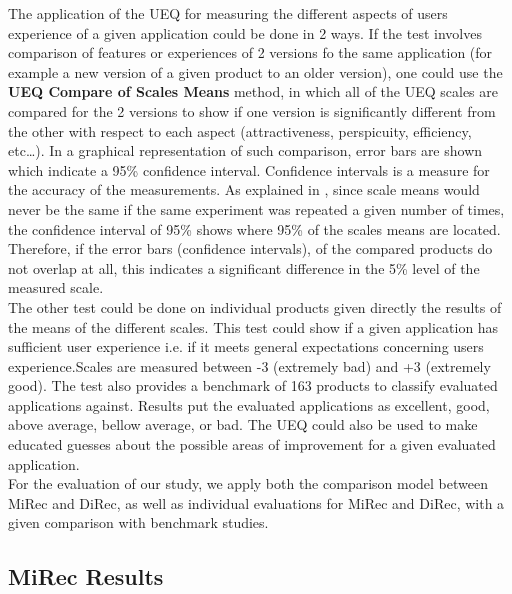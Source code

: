 The application of the UEQ for measuring the different aspects of users
experience of a given application could be done in 2 ways. If the test involves
comparison of features or experiences of 2 versions fo the same application
(for example a new version of a given product to an older version), one could
use the \textbf{UEQ Compare of Scales Means} method, in which all of the UEQ
scales are compared for the 2 versions to show if one version is significantly different
from the other with respect to each aspect (attractiveness, perspicuity,
efficiency, etc\ldots). In a graphical representation of such comparison,
error bars are shown which indicate a 95\% confidence interval. Confidence
intervals is a measure for the accuracy of the measurements. As explained in
\cite{UEQHandbook}, since scale means would never be the same if the same
experiment was repeated a given number of times, the confidence interval of 95\%
shows where 95\% of the scales means are located. Therefore, if the error bars
(confidence intervals), of the compared products do not overlap at all, this
indicates a significant difference in the 5\% level of the measured scale.
\\
The other test could be done on individual products given directly the results
of the means of the different scales. This test could show if a given
application has sufficient user experience i.e. if it meets general
expectations concerning users experience.Scales are measured between -3
(extremely bad) and +3 (extremely good). The test also provides a benchmark of
163 products to classify evaluated applications against. Results put the
evaluated applications as excellent, good, above average, bellow average,
or bad. The UEQ could also be used to make educated guesses about the possible
areas of improvement for a given evaluated application.\\

For the evaluation of our study, we apply both the comparison model between
MiRec and DiRec, as well as individual evaluations for MiRec and DiRec, with a
given comparison with benchmark studies.\\

\subsection{MiRec Results}

